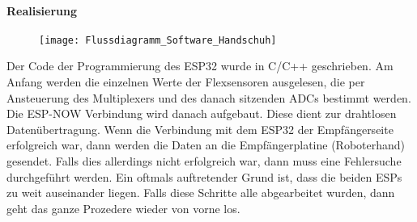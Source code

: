 \documentclass[titlepage,12pt,twoside]{article}
\begin{document}
\paragraph{Realisierung}
\hfill \break
\hfill \break
\begin{figure}[H]
	\begin{center}
		\scalebox{0.5}
		{\texttt{[image: Flussdiagramm\_Software\_Handschuh]}}
	\end{center}
\end{figure}
Der Code der Programmierung des ESP32 wurde in C/C++ geschrieben. Am Anfang werden die einzelnen Werte der Flexsensoren 
ausgelesen, die per Ansteuerung des Multiplexers und des danach sitzenden ADCs bestimmt werden. Die ESP-NOW Verbindung wird 
danach aufgebaut. Diese dient zur drahtlosen Datenübertragung. Wenn die Verbindung mit dem ESP32 der Empfängerseite erfolgreich 
war, dann werden die Daten an die Empfängerplatine (Roboterhand) gesendet. Falls dies allerdings nicht erfolgreich war, dann 
muss eine Fehlersuche durchgeführt werden. Ein oftmals auftretender Grund ist, dass die beiden ESPs zu weit auseinander liegen. 
Falls diese Schritte alle abgearbeitet wurden, dann geht das ganze Prozedere wieder von vorne los. \\
\\
\end{document}
